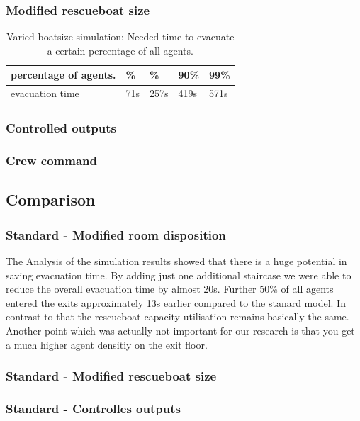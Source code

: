 \documentclass[11pt]{article}
\begin{document}
\subsubsection{Modified rescueboat size}

\begin{table}[h]
\centering
\begin{tabular}
{|>{\large}m{2cm} |>{\center}b{1.1cm} |>{\center}b{1.1cm}|>{}b{1.1cm}|>{}b{1.1cm}|} \hline \hline
percentage of agents.& 10\% &  50\% & 90\% & 99\% \\ \hline
evacuation time & 71s &257s & 419s & 571s \\ \hline \hline
\end{tabular}
\caption{Varied boatsize simulation: Needed time to evacuate a certain percentage of all agents.}
\end{table}





\subsubsection{Controlled outputs}
\subsubsection{Crew command}
\subsection{Comparison}
\subsubsection{Standard - Modified room disposition}
The Analysis of the simulation results showed that there is a huge potential in saving evacuation time. By adding just one additional staircase we were able to reduce the overall evacuation time by almost 20s. Further 50\% of all agents entered the exits approximately 13s earlier compared to the stanard model. In contrast to that the rescueboat capacity utilisation remains basically the same. Another point which was actually not important for our research is that you get a much higher agent densitiy on the exit floor. 
\subsubsection{Standard - Modified rescueboat size}
\subsubsection{Standard - Controlles outputs}
\end{document}
